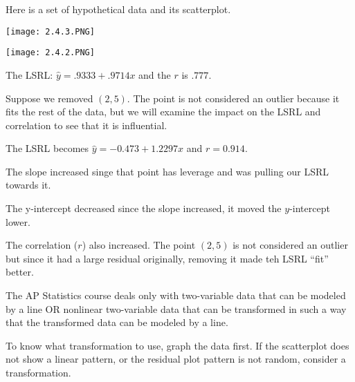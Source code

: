 \documentclass[../stats.tex]{subfiles}
\begin{document}
\pagebreak
\begin{example}
    Here is a set of hypothetical data and its scatterplot.
    \begin{center}
        \texttt{[image: 2.4.3.PNG]}
    \end{center}
    \begin{center}
        \texttt{[image: 2.4.2.PNG]}
    \end{center}

    The LSRL: $\hat{y}=.9333+.9714x$ and the $r$ is $.777$.

    Suppose we removed $(2,5)$. The point is not considered an outlier because it fits the rest of the data, but we will examine the impact on the LSRL and correlation to see that it is influential.

    The LSRL becomes $\hat{y}=-0.473+1.2297x$ and $r=0.914$.

    The slope increased singe that point has leverage and was pulling our LSRL towards it.

    The y-intercept decreased since the slope increased, it moved the $y$-intercept lower.

    The correlation ($r$) also increased. The point $(2,5)$ is not considered an outlier but since it had a large residual originally, removing it made teh LSRL ``fit'' better.
\end{example}

The AP Statistics course deals only with two-variable data that can be modeled by a line OR nonlinear two-variable data that can be transformed in such a way that the 
transformed data can be modeled by a line.

To know what transformation to use, graph the data first. If the scatterplot does not show a linear pattern, or the residual plot pattern is not random, consider a transformation.
\end{document}
